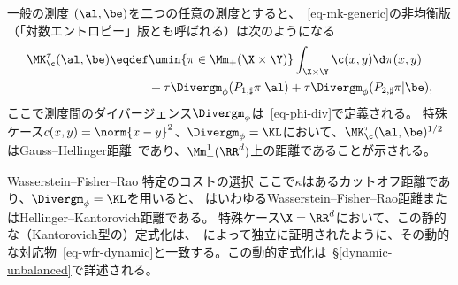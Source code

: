 \begin{rem2}{一般の測度}
$(\al,\be)$を二つの任意の測度とすると、~\eqref{eq-mk-generic}の非均衡版（「対数エントロピー」版とも呼ばれる）は次のようになる
\begin{align*}
	\MK_\c^\tau(\al,\be) \eqdef
	&\umin{\pi \in \Mm_+(\X \times \Y)}
		\int_{\X \times \Y} \c(x,y) \d\pi(x,y) \\
		&+ \tau \Divergm_\phi(P_{1,\sharp}\pi|\al)
		+ \tau \Divergm_\phi(P_{2,\sharp}\pi|\be),
\end{align*}
ここで測度間のダイバージェンス$\Divergm_\phi$は~\eqref{eq-phi-div}で定義される。
%
特殊ケース$c(x,y) = \norm{x-y}^2$、$\Divergm_\phi=\KL$において、$\MK_\c^\tau(\al,\be)^{1/2}$はGauss--Hellinger距離~\citep{LieroMielkeSavareLong}であり、$\Mm_+^1(\RR^d)$上の距離であることが示される。
\end{rem2}

\begin{rem2}{Wasserstein--Fisher--Rao}\label{rem-wfr-static}
特定のコストの選択
ここで$\kappa$はあるカットオフ距離であり、$\Divergm_\phi=\KL$を用いると、
はいわゆるWasserstein--Fisher--Rao距離またはHellinger--Kantorovich距離である。
%
%
特殊ケース$\X=\RR^d$において、この静的な（Kantorovich型の）定式化は、~\citet{LieroMielkeSavareLong,2015-chizat-unbalanced}によって独立に証明されたように、その動的な対応物~\eqref{eq-wfr-dynamic}と一致する。この動的定式化は~\S\ref{dynamic-unbalanced}で詳述される。
%
\end{rem2}


